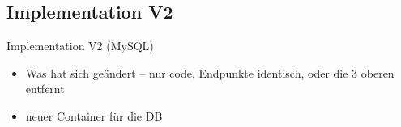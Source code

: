 \subsection{Implementation V2} \label{sec:Implementation2}
    Implementation V2 (MySQL)
    \begin{itemize}
        \item Was hat sich geändert -- nur code, Endpunkte identisch, oder die 3 oberen entfernt
        \item neuer Container für die DB
    \end{itemize}
